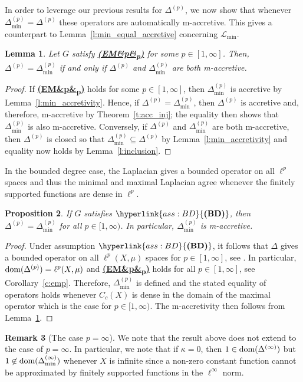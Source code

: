 \documentclass[letterpaper]{article}
\newtheorem{lemma}{Lemma}[section]
\newtheorem{proposition}[lemma]{Proposition}
\theoremstyle{definition}
\newtheorem{remark}[lemma]{Remark}
\theoremstyle{named}
\numberwithin{equation}{section}
\newcommand{\BD}{\hyperlink{ass:BD}{\textup{\textbf{(BD)}}}}
\newcommand{\EM}[1][]{\hyperlink{ass:EM}{\textup{\textbf{(EM\ifx&#1&\else\textsubscript{#1}\fi)}}}}
\newcommand{\dom}{\textnormal{dom}} %
\newcommand{\Dep}{\Delta^{(p)}}
\newcommand{\deltaphim}{\mathcal{L}_{\min}}
\newcommand{\deltam}{\Delta_{\min}}
\begin{document}
In order to leverage our previous results for $\Dep$, we now show that
whenever $\Delta_{\min}^{(p)}=\Dep$ these operators are automatically m-accretive.
This gives a counterpart to Lemma~\ref{l:min_equal_accretive} concerning $\deltaphim$.
\begin{lemma}\label{l:min_accretivity2}
Let $G$ satisfy \EM[p] for some $p \in [1,\infty]$. 
{ Then, $\Delta^{(p)}=\deltam^{(p)}$ if and only
if $\Delta^{(p)}$ and $\deltam^{(p)}$ are both m-accretive.}
\end{lemma}
\begin{proof}  
If \EM[p] holds for some $p \in [1,\infty]$, then $\deltam^{(p)}$ is accretive by Lemma~\ref{l:min_accretivity}. Hence, if $\Delta^{(p)}=\deltam^{(p)}$, then
$\Delta^{(p)}$ is accretive and, therefore, m-accretive by Theorem~\ref{t:acc_inj}; the equality then shows that $\deltam^{(p)}$ is also m-accretive. Conversely, if
$\Delta^{(p)}$ and $\deltam^{(p)}$ are both m-accretive, then $\Delta^{(p)}$
is closed so that $\deltam^{(p)} \subseteq \Dep$ by Lemma~\ref{l:min_accretivity}
and equality now holds by Lemma~\ref{l:inclusion}.
\end{proof}


In the bounded degree case, 
the Laplacian gives a bounded operator on all $\ell^p$ spaces and thus the minimal and
maximal Laplacian agree whenever the finitely supported functions are dense in $\ell^p$.
\begin{proposition}\label{p:bounded_Lap}
    If $G$ satisfies $\BD$, then $\Delta^{(p)}=\Delta^{(p)}_{\min}$ for all $p \in [1,\infty)$. 
    In particular, $\Delta^{(p)}_{\min}$ is m-accretive.
\end{proposition}
\begin{proof}
    Under assumption $\BD$, it follows that $\Delta$ gives a bounded operator
    on all $\ell^p(X,\mu)$ spaces for $p\in[1,\infty]$, see \cite[Theorem~2.15]{keller2021graphs}. 
    In particular, $\dom(\Dep) = \ell^p(X,\mu)$ and \EM[p] holds for all $p \in [1,\infty]$, see Corollary~\ref{c:emp}.
    Therefore, $\deltam^{(p)}$ is defined and the stated equality of operators holds
    whenever $C_c(X)$ is dense in the domain of the maximal operator  which is the case
    for $p \in [1,\infty)$. The m-accretivity then
    follows from Lemma~\ref{l:min_accretivity2}.
\end{proof}

\begin{remark}[The case $p=\infty$] 
    We note that the result above does not extend to the case of $p=\infty$.
    In particular, we note that if $\kappa=0$, then $1 \in \dom(\Delta^{(\infty)})$
    but $1 \not \in \dom(\deltam^{(\infty)})$ whenever $X$ is infinite since 
    a non-zero constant function cannot be approximated by finitely supported functions
    in the $\ell^\infty$ norm.
\end{remark}
\end{document}
